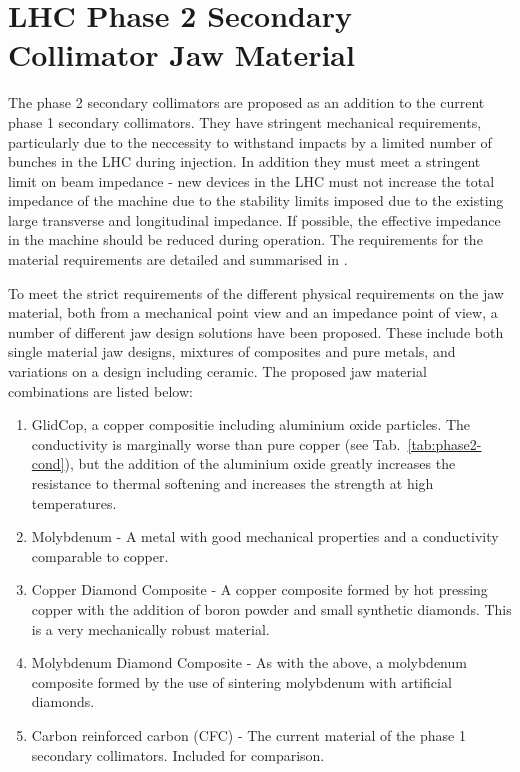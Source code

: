 \section{LHC Phase 2 Secondary Collimator Jaw Material}
\label{sec:phase-2-col-mat}

The phase 2 secondary collimators are proposed as an addition to the current phase 1 secondary collimators. They have stringent mechanical requirements, particularly due to the neccessity to withstand impacts by a limited number of bunches in the LHC during injection. In addition they must meet a stringent limit on beam impedance - new devices in the LHC must not increase the total impedance of the machine due to the stability limits imposed due to the existing large transverse and longitudinal impedance. If possible, the effective impedance in the machine should be reduced during operation. The requirements for the material requirements are detailed and summarised in \cite{Bertarelli:Mat}.

To meet the strict requirements of the different physical requirements on the jaw material, both from a mechanical point view and an impedance point of view, a number of different jaw design solutions have been proposed. These include both single material jaw designs, mixtures of composites and pure metals, and variations on a design including ceramic. The proposed jaw material combinations are listed below:

\begin{enumerate}
\item{GlidCop, a copper compositie including aluminium oxide particles. The conductivity is marginally worse than pure copper (see Tab.~\ref{tab:phase2-cond}), but the addition of the aluminium oxide greatly increases the resistance to thermal softening and increases the strength at high temperatures.}
\item{Molybdenum - A metal with good mechanical properties and a conductivity comparable to copper.}
\item{Copper Diamond Composite - A copper composite formed by hot pressing copper with the addition of boron powder and small synthetic diamonds. This is a very mechanically robust material.}
\item{Molybdenum Diamond Composite - As with the above, a molybdenum composite formed by the use of sintering molybdenum with artificial diamonds.}
\item{Carbon reinforced carbon (CFC) - The current material of the phase 1 secondary collimators. Included for comparison.}
\end{enumerate}

